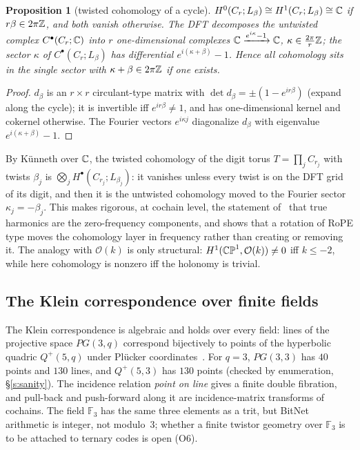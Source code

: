 \documentclass[10pt]{article}
\newtheorem{prop}[thm]{Proposition}
\theoremstyle{definition}
\newcommand{\cO}{\mathcal O}\newcommand{\cH}{\mathcal H}
\begin{document}
\begin{prop}[twisted cohomology of a cycle]\label{p:twist}
$H^0(C_r;L_\beta)\cong H^1(C_r;L_\beta)\cong\mathbb C$ if $r\beta\in2\pi\mathbb Z$, and both vanish otherwise. The DFT decomposes the untwisted complex $C^\bullet(C_r;\mathbb C)$ into $r$ one-dimensional complexes $\mathbb C\xrightarrow{e^{i\kappa}-1}\mathbb C$, $\kappa\in\frac{2\pi}{r}\mathbb Z$; the sector $\kappa$ of $C^\bullet(C_r;L_\beta)$ has differential $e^{i(\kappa+\beta)}-1$. Hence all cohomology sits in the single sector with $\kappa+\beta\in2\pi\mathbb Z$ if one exists.
\end{prop}
\begin{proof}
$d_\beta$ is an $r\times r$ circulant-type matrix with $\det d_\beta=\pm(1-e^{ir\beta})$ (expand along the cycle); it is invertible iff $e^{ir\beta}\neq1$, and has one-dimensional kernel and cokernel otherwise. The Fourier vectors $e^{i\kappa j}$ diagonalize $d_\beta$ with eigenvalue $e^{i(\kappa+\beta)}-1$.
\end{proof}
\noindent By K\"unneth over $\mathbb C$, the twisted cohomology of the digit torus $T=\prod_jC_{r_j}$ with twists $\beta_j$ is $\bigotimes_jH^\bullet(C_{r_j};L_{\beta_j})$: it vanishes unless every twist is on the DFT grid of its digit, and then it is the untwisted cohomology moved to the Fourier sector $\kappa_j=-\beta_j$. This makes rigorous, at cochain level, the statement of~\cite{dtft} that true harmonics are the zero-frequency components, and shows that a rotation of RoPE type moves the cohomology layer in frequency rather than creating or removing it. The analogy with $\cO(k)$ is only structural: $H^1(\CP^1,\cO(k))\neq0$ iff $k\le-2$, while here cohomology is nonzero iff the holonomy is trivial.

\subsection{The Klein correspondence over finite fields}
The Klein correspondence is algebraic and holds over every field: lines of the projective space $PG(3,q)$ correspond bijectively to points of the hyperbolic quadric $Q^+(5,q)$ under Pl\"ucker coordinates~\cite{hirschfeld}. For $q=3$, $PG(3,3)$ has $40$ points and $130$ lines, and $Q^+(5,3)$ has $130$ points (checked by enumeration, \S\ref{s:sanity}). The incidence relation \emph{point on line} gives a finite double fibration, and pull-back and push-forward along it are incidence-matrix transforms of cochains. The field $\mathbb F_3$ has the same three elements as a trit, but BitNet arithmetic is integer, not modulo~3; whether a finite twistor geometry over $\mathbb F_3$ is to be attached to ternary codes is open (O6).
\end{document}
